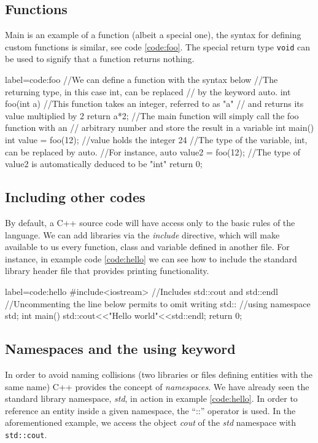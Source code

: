\documentclass[ twoside,openright,titlepage,numbers=noenddot,%
headinclude,footinclude,cleardoublepage=empty,abstract=on,
BCOR=5mm,paper=b5,fontsize=11pt, dvipsnames
]{scrreprt}
\def\ucpp{uammd_cpp_lexer.py:UAMMDCppLexer -x}
\begin{document}
\subsection*{Functions}
Main is an example of a function (albeit a special one), the syntax for defining custom functions is similar, see code \ref{code:foo}. The special return type \texttt{void} can be used to signify that a function returns nothing.

\begin{code2} {label=code:foo}
//We can define a function with the syntax below
//The returning type, in this case int, can be replaced 
// by the keyword auto.
int foo(int a){
  //This function takes an integer, referred to as "a"
  // and returns its value multiplied by 2
  return a*2;
}
//The main function will simply call the foo function with an
// arbitrary number and store the result in a variable
int main(){
  int value = foo(12);
  //value holds the integer 24
  //The type of the variable, int, can be replaced by auto.
  //For instance,
  auto value2 = foo(12);
  //The type of value2 is automatically deduced to be "int"
  return 0;
}
\end{code2}

\subsection*{Including other codes}
By default, a C++ source code will have access only to the basic rules of the language. We can add libraries via the \emph{include} directive, which will make available to us every function, class and variable defined in another file. For instance, in example code \ref{code:hello} we can see how to include the standard library header file that provides printing functionality.

\begin{code2} {label=code:hello}
  #include<iostream> //Includes std::cout and std::endl
  //Uncommenting the line below permits to omit writing std::
  //using namespace std;
  int main(){    
    std::cout<<"Hello world"<<std::endl;    
    return 0;  
  }
\end{code2}

\subsection*{Namespaces and the using keyword}
In order to avoid naming collisions (two libraries or files defining entities with the same name) C++ provides the concept of \emph{namespaces}. We have already seen the standard library namespace, \emph{std}, in action in example \ref{code:hello}. In order to reference an entity inside a given namespace, the ``::'' operator is used. In the aforementioned example, we access the object \emph{cout} of the \emph{std} namespace with \texttt{std::cout}.
\end{document}
